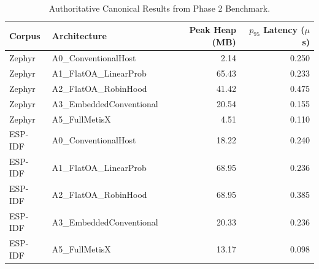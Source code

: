 \begin{table}[h]
\centering
\begin{tabular}{llrr}
\toprule
Corpus & Architecture & Peak Heap (MB) & $p_{95}$ Latency ($\mu$s) \\
\midrule
Zephyr & A0\_ConventionalHost & 2.14 & 0.250 \\
Zephyr & A1\_FlatOA\_LinearProb & 65.43 & 0.233 \\
Zephyr & A2\_FlatOA\_RobinHood & 41.42 & 0.475 \\
Zephyr & A3\_EmbeddedConventional & 20.54 & 0.155 \\
Zephyr & A5\_FullMetisX & 4.51 & 0.110 \\
ESP-IDF & A0\_ConventionalHost & 18.22 & 0.240 \\
ESP-IDF & A1\_FlatOA\_LinearProb & 68.95 & 0.236 \\
ESP-IDF & A2\_FlatOA\_RobinHood & 68.95 & 0.385 \\
ESP-IDF & A3\_EmbeddedConventional & 20.33 & 0.236 \\
ESP-IDF & A5\_FullMetisX & 13.17 & 0.098 \\
\bottomrule
\end{tabular}
\caption{Authoritative Canonical Results from Phase 2 Benchmark.}
\label{tab:canonical_results}
\end{table}

